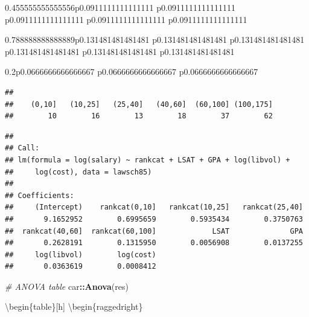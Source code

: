 \documentclass[]{book}
\newenvironment{Shaded}{\begin{snugshade}}{\end{snugshade}}
\newcommand{\CommentTok}[1]{\textcolor[rgb]{0.56,0.35,0.01}{\textit{#1}}}
\newcommand{\DataTypeTok}[1]{\textcolor[rgb]{0.13,0.29,0.53}{#1}}
\newcommand{\KeywordTok}[1]{\textcolor[rgb]{0.13,0.29,0.53}{\textbf{#1}}}
\newcommand{\NormalTok}[1]{#1}
\newcommand{\OperatorTok}[1]{\textcolor[rgb]{0.81,0.36,0.00}{\textbf{#1}}}
\newcommand{\StringTok}[1]{\textcolor[rgb]{0.31,0.60,0.02}{#1}}
\begin{document}
\begin{tabularx}{0.455555555555556\textwidth}{p{} p{} p{} p{} p{}}
\begin{tabularx}{0.788888888888889\textwidth}{p{} p{} p{} p{} p{} p{}}
\begin{tabularx}{0.2\textwidth}{p{} p{} p{}}
\begin{verbatim}
## 
##    (0,10]   (10,25]   (25,40]   (40,60]  (60,100] (100,175] 
##        10        16        13        18        37        62
\end{verbatim}

\begin{Shaded}
\begin{Highlighting}[]
\CommentTok{# Choose reference category}
\NormalTok{lawsch85}\OperatorTok{$}\NormalTok{rankcat <-}\StringTok{ }\KeywordTok{relevel}\NormalTok{(lawsch85}\OperatorTok{$}\NormalTok{rankcat,}\StringTok{"(100,175]"}\NormalTok{)}

\CommentTok{# Run regression}
\NormalTok{(res <-}\StringTok{ }\KeywordTok{lm}\NormalTok{(}\KeywordTok{log}\NormalTok{(salary)}\OperatorTok{~}\NormalTok{rankcat}\OperatorTok{+}\NormalTok{LSAT}\OperatorTok{+}\NormalTok{GPA}\OperatorTok{+}\KeywordTok{log}\NormalTok{(libvol)}\OperatorTok{+}\KeywordTok{log}\NormalTok{(cost), }\DataTypeTok{data=}\NormalTok{lawsch85))}
\end{Highlighting}
\end{Shaded}

\begin{verbatim}
## 
## Call:
## lm(formula = log(salary) ~ rankcat + LSAT + GPA + log(libvol) + 
##     log(cost), data = lawsch85)
## 
## Coefficients:
##     (Intercept)    rankcat(0,10]   rankcat(10,25]   rankcat(25,40]  
##       9.1652952        0.6995659        0.5935434        0.3750763  
##  rankcat(40,60]  rankcat(60,100]             LSAT              GPA  
##       0.2628191        0.1315950        0.0056908        0.0137255  
##     log(libvol)        log(cost)  
##       0.0363619        0.0008412
\end{verbatim}

\begin{Shaded}
\begin{Highlighting}[]
\CommentTok{# ANOVA table}
\NormalTok{car}\OperatorTok{::}\KeywordTok{Anova}\NormalTok{(res)}
\end{Highlighting}
\end{Shaded}

\textbackslash{}begin\{table\}{[}h{]}
\textbackslash{}begin\{raggedright\}


\end{tabularx}
\end{tabularx}
\end{tabularx}
\end{document}
